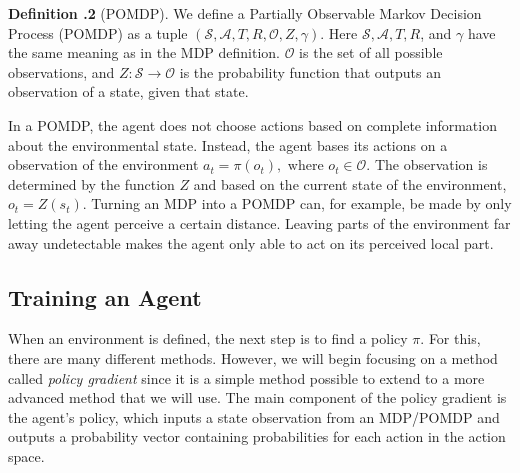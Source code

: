 \documentclass[12pt,A4]{report}
\theoremstyle{definition}
\newtheorem{definition}{Definition}[section]
\begin{document}
\begin{displayquote}
  \textbf{Definition \thesection.2} (POMDP). We define a Partially Observable Markov Decision Process (POMDP) as a tuple $(\mathcal{S}, \mathcal{A}, T, R, \mathcal{O}, Z, \gamma)$. Here $\mathcal{S}, \mathcal{A}, T, R$, and $\gamma$ have the same meaning as in the MDP definition. $\mathcal{O}$ is the set of all possible observations, and $Z : \mathcal{S} \rightarrow \mathcal{O}$ is the probability function that outputs an observation of a state, given that state. 
\end{displayquote}
In a POMDP, the agent does not choose actions based on complete information about the environmental state. Instead, the agent bases its actions on a observation of the environment $a_t = \pi(o_t), \text{ where } o_t \in \mathcal{O}$. The observation is determined by the function $Z$ and based on the current state of the environment, $o_t = Z(s_t)$. Turning an MDP into a POMDP can, for example, be made by only letting the agent perceive a certain distance. Leaving parts of the environment far away undetectable makes the agent only able to act on its perceived local part. %

\subsection{Training an Agent}

When an environment is defined, the next step is to find a policy $\pi$. For this, there are many different methods. However, we will begin focusing on a method called \textit{policy gradient} since it is a simple method possible to extend to a more advanced method that we will use. The main component of the policy gradient is the agent's policy, which inputs a state observation from an MDP/POMDP and outputs a probability vector containing probabilities for each action in the action space. 
\end{document}
